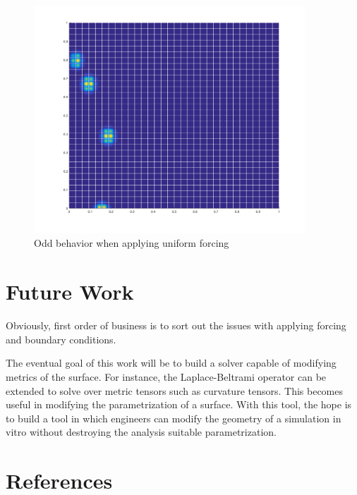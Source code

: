 \documentclass[preprint,1p,12pt]{elsarticle}
\begin{document}
\begin{figure}[!htbp]
  \centerline{\includegraphics[width=4in]{./figures/badSolution2}}
  \caption{Odd behavior when applying uniform forcing}
  \label{fig:badResult2}
\end{figure}

\section{Future Work}
Obviously, first order of business is to sort out the issues with applying forcing and boundary conditions. 

The eventual goal of this work will be to build a solver capable of modifying metrics of the surface. For instance, the Laplace-Beltrami operator can be extended to solve over metric tensors such as curvature tensors. This becomes useful in modifying the parametrization of a surface. With this tool, the hope is to build a tool in which engineers can modify the geometry of a simulation in vitro without destroying the analysis suitable parametrization. 

\section{References}\label{Ref}
 







\end{document}
